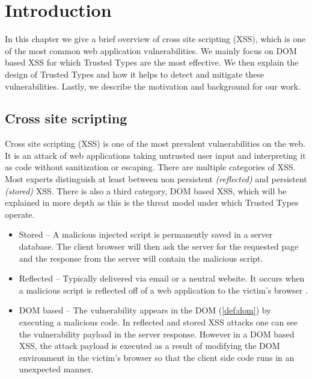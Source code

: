 \chapter{Introduction}
\label{chapter_intro}

In this chapter we give a brief overview of cross site scripting (XSS), which is one of the most
common web application vulnerabilities. We mainly focus on DOM based XSS for which Trusted Types are
the most effective. We then explain the design of Trusted Types and how it helps to detect and
mitigate these vulnerabilities. Lastly, we describe the motivation and background for our work.

\section{Cross site scripting}

Cross site scripting (XSS) is one of the most prevalent vulnerabilities on the web. It is an attack
of web applications taking untrusted user input and interpreting it as code without sanitization or
escaping. There are multiple categories of XSS. Most experts distinguish at least between
non persistent \emph{(reflected)} and persistent \emph{(stored)} XSS. There is also a third
category, DOM based XSS, which will be explained in more depth as this is the threat model
under which Trusted Types operate.

\begin{itemize}
  \item  Stored -- A malicious injected script is permanently saved in a server database. The client
        browser will then ask the server for the requested page and the response from the server
        will contain the malicious script.
  \item  Reflected -- Typically delivered via email or a neutral website. It occurs when a
        malicious script is reflected off of a web application to the victim's browser
        \cite{reflected_xss}.
  \item  DOM based -- The vulnerability appears in the DOM (\ref{def:dom}) by executing a malicious
        code. In reflected and stored XSS attacks one can see the vulnerability payload in the
        server response. However in a DOM based XSS, the attack payload is executed as a result of
        modifying the DOM environment in the victim's browser so that the client side code runs in
        an unexpected manner.
\end{itemize}

